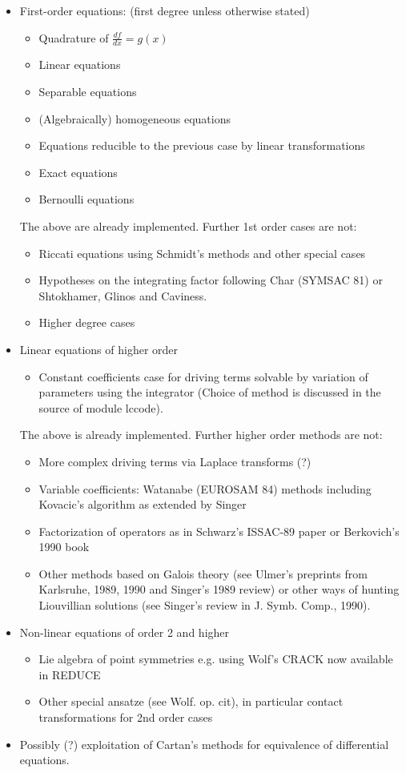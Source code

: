 \begin{itemize}
\item First-order equations: (first degree unless otherwise stated)

\begin{itemize}
\item Quadrature of $\frac{df}{dx} = g(x)$
\item Linear equations
\item Separable equations
\item (Algebraically) homogeneous equations
\item Equations reducible to the previous case by linear transformations
\item Exact equations
\item Bernoulli equations
\end{itemize}

The above are already implemented. Further 1st order cases are not:
\begin{itemize}
\item Riccati equations using Schmidt's methods and other special cases
\item Hypotheses on the integrating factor following Char (SYMSAC 81)
or Shtokhamer, Glinos and Caviness.
\item Higher degree cases
\end{itemize}
\item Linear equations of higher order
\begin{itemize}
\item Constant coefficients case for driving terms solvable by
variation of parameters using the integrator
(Choice of method is discussed in the source of module lccode).
\end{itemize}
The above is already implemented. Further higher order methods are not:
\begin{itemize}
\item More complex driving terms via Laplace transforms (?)
\item  Variable coefficients: Watanabe (EUROSAM 84) methods
including Kovacic's algorithm as extended by Singer
\item  Factorization of operators as in Schwarz's ISSAC-89 paper or
Berkovich's 1990 book
\item  Other methods based on Galois theory (see Ulmer's preprints
from Karlsruhe, 1989, 1990 and Singer's 1989 review) or
other ways of hunting Liouvillian solutions (see Singer's
review in J. Symb. Comp., 1990).
\end{itemize}
\item Non-linear equations of order 2 and higher
\begin{itemize}
\item Lie algebra of point symmetries e.g. using Wolf's CRACK now available
in REDUCE
\item  Other special ansatze (see Wolf. op. cit), in particular
contact transformations for 2nd order cases
\end{itemize}
\item Possibly (?) exploitation of Cartan's methods for equivalence of
differential equations.
\end{itemize}


